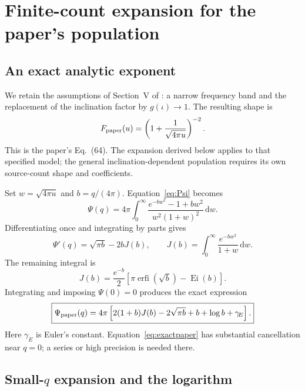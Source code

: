 \documentclass[11pt]{article}
\newcommand{\dd}{\mathrm d}
\newcommand{\erfi}{\operatorname{erfi}}
\newcommand{\Ei}{\operatorname{Ei}}
\newcommand{\gE}{\gamma_{\!E}}
\begin{document}
\section{Finite-count expansion for the paper's population}
\label{sec:paper}

\subsection{An exact analytic exponent}

We retain the assumptions of Section~V of \citet{AliHaimoud2026}: a narrow
frequency band and the replacement of the inclination factor by
$g(\iota)\to1$. The resulting shape is
\begin{equation}
 F_{\rm paper}(u)=\left(1+\frac{1}{\sqrt{4\pi u}}\right)^{-2}.
 \label{eq:Fpaper}
\end{equation}
This is the paper's Eq.~(64). The expansion derived below applies to that
specified model; the general inclination-dependent population requires its
own source-count shape and coefficients.

Set $w=\sqrt{4\pi u}$ and $b=q/(4\pi)$. Equation~\eqref{eq:Psi} becomes
\begin{equation}
 \Psi(q)=4\pi\int_0^\infty
 \frac{e^{-bw^2}-1+bw^2}{w^2(1+w)^2}\,\dd w.
 \label{eq:Psiw}
\end{equation}
Differentiating once and integrating by parts gives
\begin{equation}
 \Psi'(q)=\sqrt{\pi b}-2bJ(b),\qquad
 J(b)=\int_0^\infty\frac{e^{-bw^2}}{1+w}\,\dd w.
 \label{eq:Psiprime}
\end{equation}
The remaining integral is
\begin{equation}
 J(b)=\frac{e^{-b}}{2}
       \left[\pi\erfi(\sqrt b)-\Ei(b)\right].
 \label{eq:J}
\end{equation}
Integrating and imposing $\Psi(0)=0$ produces the exact expression
\begin{equation}
 \boxed{\displaystyle
 \Psi_{\rm paper}(q)=4\pi\left[
  2(1+b)J(b)-2\sqrt{\pi b}+b+\log b+\gE\right].}
 \label{eq:exactpaper}
\end{equation}
Here $\gE$ is Euler's constant. Equation~\eqref{eq:exactpaper} has substantial
cancellation near $q=0$; a series or high precision is needed there.

\subsection{Small-\texorpdfstring{$q$}{q} expansion and the logarithm}
\end{document}
